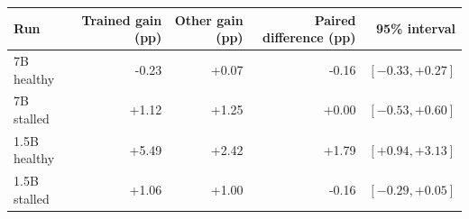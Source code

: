\begin{tabular}{lrrrr}
\toprule
Run & Trained gain (pp) & Other gain (pp) & Paired difference (pp) & 95\% interval \\
\midrule
7B healthy & -0.23 & +0.07 & -0.16 & $[-0.33,+0.27]$ \\
7B stalled & +1.12 & +1.25 & +0.00 & $[-0.53,+0.60]$ \\
1.5B healthy & +5.49 & +2.42 & +1.79 & $[+0.94,+3.13]$ \\
1.5B stalled & +1.06 & +1.00 & -0.16 & $[-0.29,+0.05]$ \\
\bottomrule
\end{tabular}
